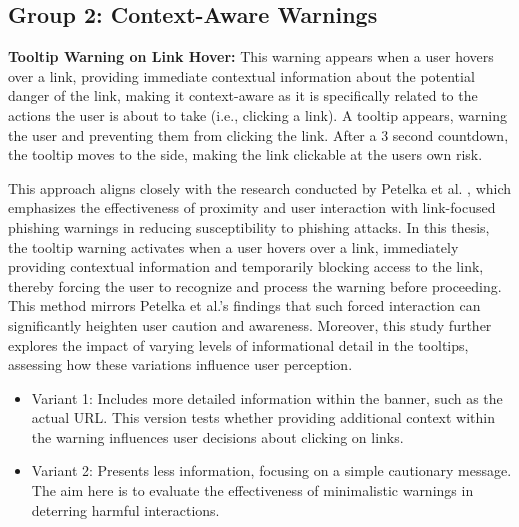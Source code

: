 \documentclass[
  a4paper,  %
  twoside,  %
  bibliography=totoc,
  headsepline,
  cleardoublepage=empty,
  parskip=half,
  draft=false
]{scrbook}
\begin{document}
\subsection{Group 2: Context-Aware Warnings}

\textbf{Tooltip Warning on Link Hover:} This warning appears when a user hovers over a link, providing immediate contextual information about the potential danger of the link, making it context-aware as it is specifically related to the actions the user is about to take (i.e., clicking a link). A tooltip appears, warning the user and preventing them from clicking the link. After a 3 second countdown, the tooltip moves to the side, making the link clickable at the users own risk. 

This approach aligns closely with the research conducted by Petelka et al. \cite{petelka}, which emphasizes the effectiveness of proximity and user interaction with link-focused phishing warnings in reducing susceptibility to phishing attacks. In this thesis, the tooltip warning activates when a user hovers over a link, immediately providing contextual information and temporarily blocking access to the link, thereby forcing the user to recognize and process the warning before proceeding. This method mirrors Petelka et al.'s findings that such forced interaction can significantly heighten user caution and awareness. Moreover, this study further explores the impact of varying levels of informational detail in the tooltips, assessing how these variations influence user perception.

\begin{itemize}
    \item Variant 1: Includes more detailed information within the banner, such as the actual URL. This version tests whether providing additional context within the warning influences user decisions about clicking on links.
    \item Variant 2: Presents less information, focusing on a simple cautionary message. The aim here is to evaluate the effectiveness of minimalistic warnings in deterring harmful interactions.
\end{itemize}
\end{document}
